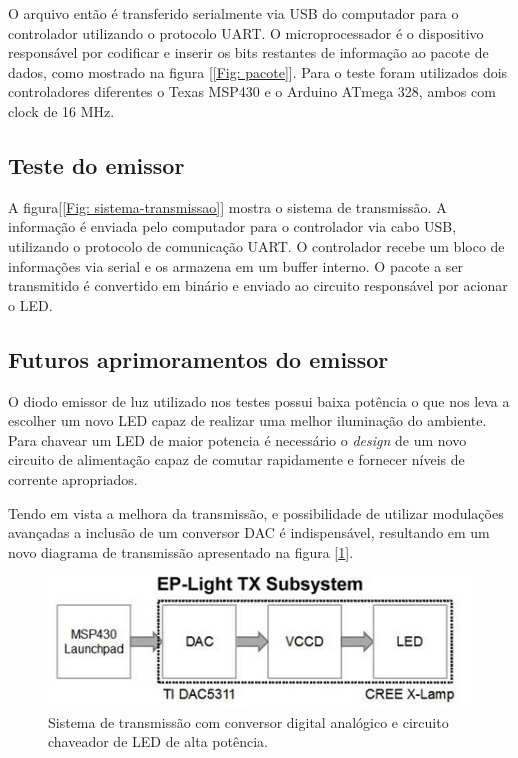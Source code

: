 O arquivo então é transferido serialmente via USB do computador para o controlador utilizando o protocolo UART. O microprocessador é o dispositivo responsável por codificar e inserir os bits restantes de informação ao pacote de dados, como mostrado na figura [\ref{Fig: pacote}]. Para o teste foram utilizados dois controladores diferentes o Texas MSP430 e o Arduino ATmega 328, ambos com clock de 16 MHz.


\subsection{Teste do emissor}

A figura[\ref{Fig: sistema-transmissao}] mostra o sistema de transmissão. A informação é
enviada pelo computador para o controlador via cabo USB, utilizando o protocolo de 
comunicação UART. O controlador recebe um bloco de informações via serial e os armazena em um buffer interno. O pacote a ser transmitido é convertido em binário e enviado ao circuito responsável por acionar o LED.


\subsection{Futuros aprimoramentos do emissor}

O diodo emissor de luz utilizado nos testes possui baixa potência o que nos leva a escolher um
novo LED capaz de realizar uma melhor iluminação do ambiente. Para chavear um LED de maior 
potencia é necessário o \textit{design} de um novo circuito de alimentação capaz de comutar 
rapidamente e fornecer níveis de corrente apropriados. 

Tendo em vista a melhora da transmissão, e possibilidade de utilizar modulações avançadas a inclusão de um conversor DAC é indispensável, resultando em um novo diagrama de transmissão apresentado na figura [\ref{Fig: sistema-futuro-transmissao}].

 \begin{figure}
	\centering
		\includegraphics[width = 12cm]{figuras/sistema-futuro-transmissao}
	\caption{Sistema de transmissão com conversor digital analógico e circuito chaveador de LED de alta potência.}
	\label{Fig: sistema-futuro-transmissao}
\end{figure}

